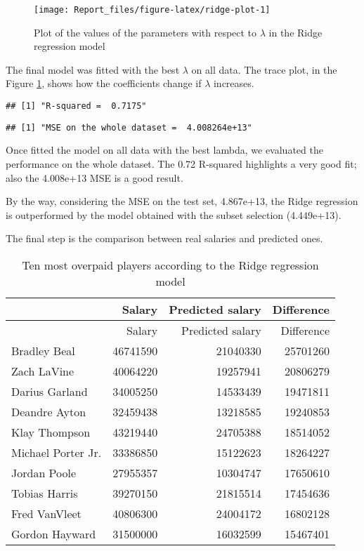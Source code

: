 \documentclass[
]{article}
\begin{document}
\begin{figure}

{\centering \texttt{[image: Report\_files/figure-latex/ridge-plot-1]} 

}

\caption{Plot of the values of the parameters with respect to $\lambda$ in the Ridge regression model \label{fig:ridge-plot}}\label{fig:ridge-plot}
\end{figure}

The final model was fitted with the best \(\lambda\) on all data. The
trace plot, in the Figure \ref{fig:ridge-plot}, shows how the
coefficients change if \(\lambda\) increases.

\begin{verbatim}
## [1] "R-squared =  0.7175"
\end{verbatim}

\begin{verbatim}
## [1] "MSE on the whole dataset =  4.008264e+13"
\end{verbatim}

Once fitted the model on all data with the best lambda, we evaluated the
performance on the whole dataset. The 0.72 R-squared highlights a very
good fit; also the 4.008e+13 MSE is a good result.

By the way, considering the MSE on the test set, 4.867e+13, the Ridge
regression is outperformed by the model obtained with the subset
selection (4.449e+13).

The final step is the comparison between real salaries and predicted
ones.

\begin{longtable}[]{@{}lrrr@{}}
\caption{Ten most overpaid players according to the Ridge regression
model}\tabularnewline
\toprule()
& Salary & Predicted salary & Difference \\
\midrule()
\endfirsthead
\toprule()
& Salary & Predicted salary & Difference \\
\midrule()
\endhead
Bradley Beal & 46741590 & 21040330 & 25701260 \\
Zach LaVine & 40064220 & 19257941 & 20806279 \\
Darius Garland & 34005250 & 14533439 & 19471811 \\
Deandre Ayton & 32459438 & 13218585 & 19240853 \\
Klay Thompson & 43219440 & 24705388 & 18514052 \\
Michael Porter Jr. & 33386850 & 15122623 & 18264227 \\
Jordan Poole & 27955357 & 10304747 & 17650610 \\
Tobias Harris & 39270150 & 21815514 & 17454636 \\
Fred VanVleet & 40806300 & 24004172 & 16802128 \\
Gordon Hayward & 31500000 & 16032599 & 15467401 \\
\bottomrule()
\end{longtable}
\end{document}
